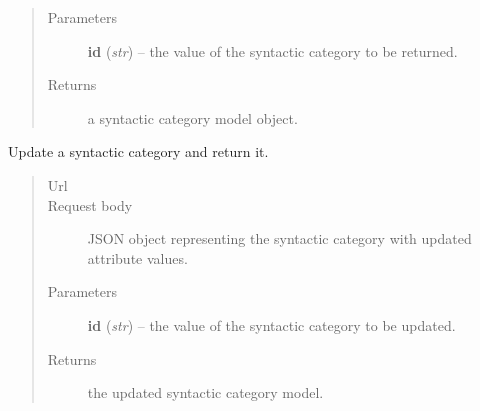 \documentclass[letterpaper,10pt,english]{sphinxmanual}
\begin{document}
\begin{fulllineitems}
\begin{fulllineitems}
\begin{quote}
\begin{description}
\item[{Parameters}] \leavevmode
\textbf{id} (\emph{str}) -- the  value of the syntactic category to be returned.

\item[{Returns}] \leavevmode
a syntactic category model object.

\end{description}\end{quote}

\end{fulllineitems}


\begin{fulllineitems}
\label{api:onlinelinguisticdatabase.controllers.syntacticcategories.SyntacticcategoriesController.update}
Update a syntactic category and return it.
\begin{quote}\begin{description}
\item[{Url }] \leavevmode
{}

\item[{Request body}] \leavevmode
JSON object representing the syntactic category with updated attribute values.

\item[{Parameters}] \leavevmode
\textbf{id} (\emph{str}) -- the  value of the syntactic category to be updated.

\item[{Returns}] \leavevmode
the updated syntactic category model.

\end{description}\end{quote}

\end{fulllineitems}


\end{fulllineitems}

\end{document}
